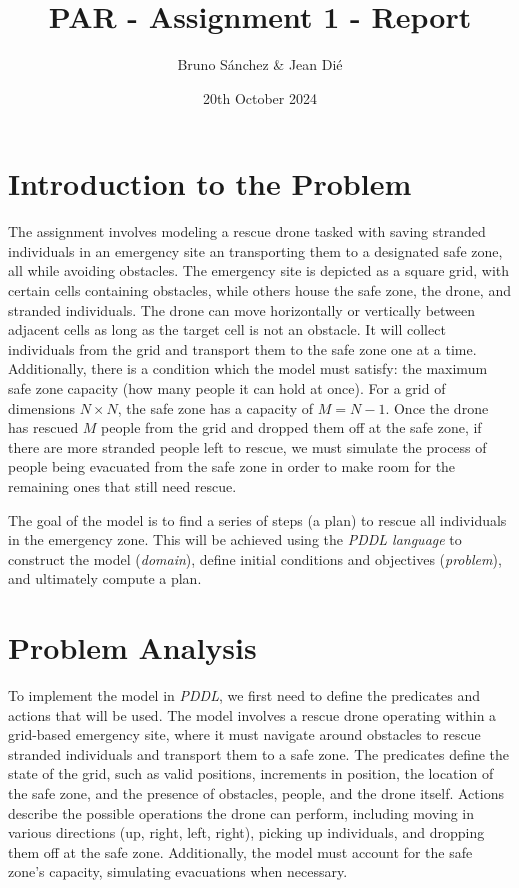 \documentclass{article}
\begin{document}
\title{PAR - Assignment 1 - Report}
\author{\normalsize Bruno Sánchez \& Jean Dié}
\date{\small 20th October 2024}

\maketitle

\section{Introduction to the Problem}

The assignment involves modeling a rescue drone tasked with saving stranded individuals in an emergency site an transporting them to a designated safe zone, all while avoiding obstacles. The emergency site is depicted as a square grid, with certain cells containing obstacles, while others house the safe zone, the drone, and stranded individuals. The drone can move horizontally or vertically between adjacent cells as long as the target cell is not an obstacle. It will collect individuals from the grid and transport them to the safe zone one at a time. Additionally, there is a condition which the model must satisfy: the maximum safe zone capacity (how many people it can hold at once). For a grid of dimensions \(N \times N\), the safe zone has a capacity of \(M = N - 1\). Once the drone has rescued \(M\) people from the grid and dropped them off at the safe zone, if there are more stranded people left to rescue, we must simulate the process of people being evacuated from the safe zone in order to make room for the remaining ones that still need rescue.

The goal of the model is to find a series of steps (a plan) to rescue all individuals in the emergency zone. This will be achieved using the \textit{PDDL language} to construct the model (\textit{domain}), define initial conditions and objectives (\textit{problem}), and ultimately compute a plan.

\section{Problem Analysis}

To implement the model in \textit{PDDL}, we first need to define the predicates and actions that will be used. The model involves a rescue drone operating within a grid-based emergency site, where it must navigate around obstacles to rescue stranded individuals and transport them to a safe zone. The predicates define the state of the grid, such as valid positions, increments in position, the location of the safe zone, and the presence of obstacles, people, and the drone itself. Actions describe the possible operations the drone can perform, including moving in various directions (up, right, left, right), picking up individuals, and dropping them off at the safe zone. Additionally, the model must account for the safe zone's capacity, simulating evacuations when necessary.
\end{document}
